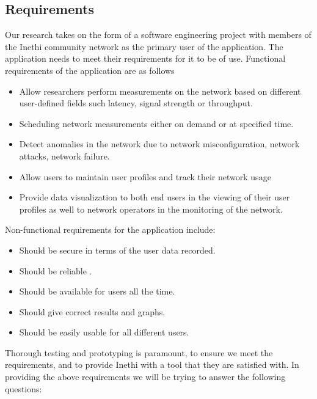\subsection{Requirements}
Our research takes on the form of a software engineering project with members of the Inethi community network as the primary user of the application. The application needs to meet their requirements for it to be of use.
Functional requirements of the application are as follows 
\begin{itemize} %
	\item Allow researchers perform measurements on the network based on different user-defined fields such latency, signal strength or throughput. %
	\item Scheduling network measurements either on demand or at specified time. %
	\item Detect anomalies in the network due to network misconfiguration, network attacks, network failure. 
	\item Allow users to maintain user profiles and track their network usage
	\item Provide data visualization to both end users in the viewing of their user profiles as well to network operators in the monitoring of the network.
\end{itemize}
Non-functional requirements for the application include:
\begin{itemize}
	\item Should be secure in terms of the user data recorded.
	\item Should be reliable .
	\item Should be available for users all the time.
	\item Should  give correct results and graphs.
	\item Should be easily usable for all different users.
\end{itemize}
Thorough testing and prototyping is paramount, to ensure we meet the requirements, and to provide Inethi with a tool that they are satisfied with.
In providing the above requirements we will be trying to answer the following questions:
